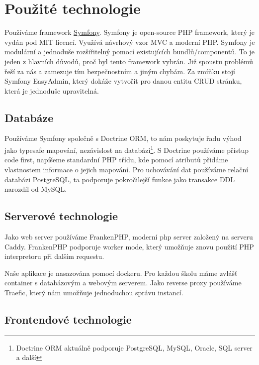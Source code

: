 \section{Použité technologie}

Používáme framework \href{https://symfony.com/}{Symfony}. Symfony je open-source PHP framework, který je vydán pod MIT licencí.  Využívá návrhový vzor MVC a moderní PHP. Symfony je modulární a jednoduše rozšiřitelný pomocí existujících bundlů/componentů. To je jeden z hlavních důvodů, proč byl tento framework vybrán. Již spoustu problémů řeší za nás a zamezuje tím bezpečnostním a jiným chybám.
Za zmíňku stojí Symfony EasyAdmin, který dokáže vytvořit pro danou entitu CRUD stránku, která je jednoduše upravitelná.

\subsection{Databáze}
Používáme Symfony společně s Doctrine ORM, to nám poskytuje řadu výhod jako typesafe mapování, nezávislost na databázi\footnote{Doctrine ORM aktuálně podporuje PostgreSQL, MySQL, Oracle, SQL server a další\cite{doctrine-supported-dbs}}. S Doctrine používáme přístup code first, napíšeme standardní PHP třídu, kde pomocí atributů přidáme vlastnostem informace o jejich mapování. 
Pro uchovávání dat používáme relační databázi PostgreSQL, ta podporuje  pokročilejší funkce jako transakce DDL narozdíl od MySQL.  

\subsection{Serverové technologie}
Jako web server používáme FrankenPHP, moderní php server založený na serveru Caddy. FrankenPHP podporuje worker mode, který umožňuje znovu použití PHP interpretoru při dalším requestu.

Naše aplikace je nasazována pomocí dockeru. Pro každou školu máme zvlášť container s databázovým a webovým serverem.
Jako reverse proxy používáme Traefic, který nám umožňuje jednoduchou správu instancí.

\subsection{Frontendové technologie}

